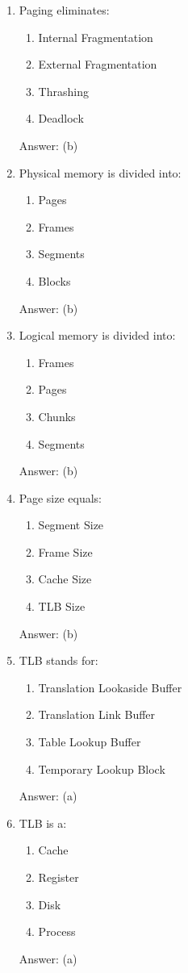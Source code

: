 \begin{enumerate}
\item Paging eliminates:
\begin{enumerate}[label=(\alph*)]
\item Internal Fragmentation
\item External Fragmentation
\item Thrashing
\item Deadlock
\end{enumerate}
Answer: (b)

\item Physical memory is divided into:
\begin{enumerate}[label=(\alph*)]
\item Pages
\item Frames
\item Segments
\item Blocks
\end{enumerate}
Answer: (b)

\item Logical memory is divided into:
\begin{enumerate}[label=(\alph*)]
\item Frames
\item Pages
\item Chunks
\item Segments
\end{enumerate}
Answer: (b)

\item Page size equals:
\begin{enumerate}[label=(\alph*)]
\item Segment Size
\item Frame Size
\item Cache Size
\item TLB Size
\end{enumerate}
Answer: (b)

\item TLB stands for:
\begin{enumerate}[label=(\alph*)]
\item Translation Lookaside Buffer
\item Translation Link Buffer
\item Table Lookup Buffer
\item Temporary Lookup Block
\end{enumerate}
Answer: (a)

\item TLB is a:
\begin{enumerate}[label=(\alph*)]
\item Cache
\item Register
\item Disk
\item Process
\end{enumerate}
Answer: (a)


\end{enumerate}
